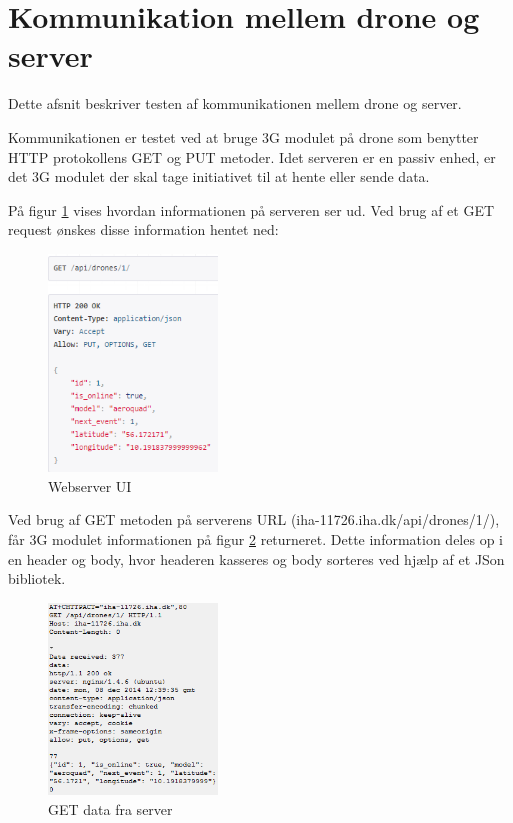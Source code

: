 \section{Kommunikation mellem drone og server}

Dette afsnit beskriver testen af kommunikationen mellem drone og server. 

Kommunikationen er testet ved at bruge 3G modulet på drone som benytter HTTP protokollens GET og PUT metoder. 
Idet serveren er en passiv enhed, er det 3G modulet der skal tage initiativet til at hente eller sende data. 

På figur \ref{fig:integrationstest_webserver} vises hvordan informationen på serveren ser ud. Ved brug af et GET request ønskes disse information hentet ned: 

\begin{figure}[H]
\centering
\includegraphics[width=0.4\textwidth]{Billeder/Test/integratest_webserver.png}
\caption{Webserver UI}
\label{fig:integrationstest_webserver}
\end{figure}

\newpage
Ved brug af GET metoden på serverens URL (iha-11726.iha.dk/api/drones/1/), får 3G modulet informationen på figur \ref{fig:getfromserver} returneret. Dette information deles op i en header og body, hvor headeren kasseres og body sorteres ved hjælp af et JSon bibliotek.

\begin{figure}[H]
\centering
\includegraphics[width=0.4\textwidth]{Billeder/Test/getfromserver.png}
\caption{GET data fra server}
\label{fig:getfromserver}
\end{figure}

